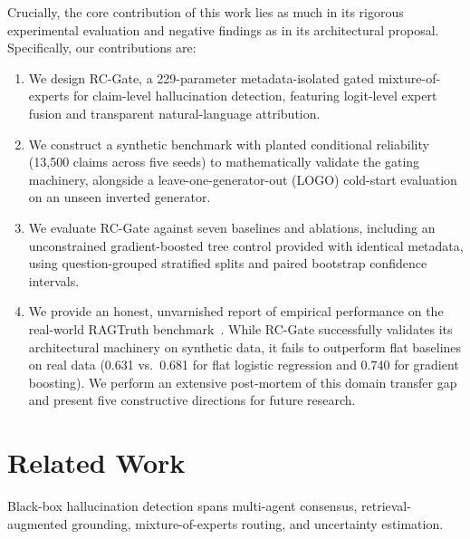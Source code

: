 \documentclass[pdflatex,sn-mathphys,Numbered]{sn-jnl}
\begin{document}
Crucially, the core contribution of this work lies as much in its rigorous experimental evaluation and negative findings as in its architectural proposal. Specifically, our contributions are:
\begin{enumerate}
    \item We design RC-Gate, a 229-parameter metadata-isolated gated mixture-of-experts for claim-level hallucination detection, featuring logit-level expert fusion and transparent natural-language attribution.
    \item We construct a synthetic benchmark with planted conditional reliability (13,500 claims across five seeds) to mathematically validate the gating machinery, alongside a leave-one-generator-out (LOGO) cold-start evaluation on an unseen inverted generator.
    \item We evaluate RC-Gate against seven baselines and ablations, including an unconstrained gradient-boosted tree control provided with identical metadata, using question-grouped stratified splits and paired bootstrap confidence intervals.
    \item We provide an honest, unvarnished report of empirical performance on the real-world RAGTruth benchmark~\cite{niu2024ragtruth}. While RC-Gate successfully validates its architectural machinery on synthetic data, it fails to outperform flat baselines on real data (0.631 vs.\ 0.681 for flat logistic regression and 0.740 for gradient boosting). We perform an extensive post-mortem of this domain transfer gap and present five constructive directions for future research.
\end{enumerate}

\section{Related Work}\label{sec:related}

Black-box hallucination detection spans multi-agent consensus, retrieval-augmented grounding, mixture-of-experts routing, and uncertainty estimation.
\end{document}
